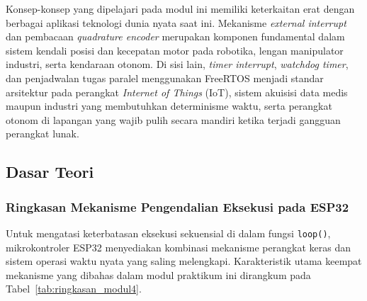 Konsep-konsep yang dipelajari pada modul ini memiliki keterkaitan erat dengan berbagai aplikasi teknologi dunia nyata saat ini. Mekanisme \textit{external interrupt} dan pembacaan \textit{quadrature encoder} merupakan komponen fundamental dalam sistem kendali posisi dan kecepatan motor pada robotika, lengan manipulator industri, serta kendaraan otonom. Di sisi lain, \textit{timer interrupt}, \textit{watchdog timer}, dan penjadwalan tugas paralel menggunakan FreeRTOS menjadi standar arsitektur pada perangkat \textit{Internet of Things} (IoT), sistem akuisisi data medis maupun industri yang membutuhkan determinisme waktu, serta perangkat otonom di lapangan yang wajib pulih secara mandiri ketika terjadi gangguan perangkat lunak.

\subsection{Dasar Teori}

\subsubsection{Ringkasan Mekanisme Pengendalian Eksekusi pada ESP32}
Untuk mengatasi keterbatasan eksekusi sekuensial di dalam fungsi \texttt{loop()}, mikrokontroler ESP32 menyediakan kombinasi mekanisme perangkat keras dan sistem operasi waktu nyata yang saling melengkapi. Karakteristik utama keempat mekanisme yang dibahas dalam modul praktikum ini dirangkum pada Tabel~\ref{tab:ringkasan_modul4}.

